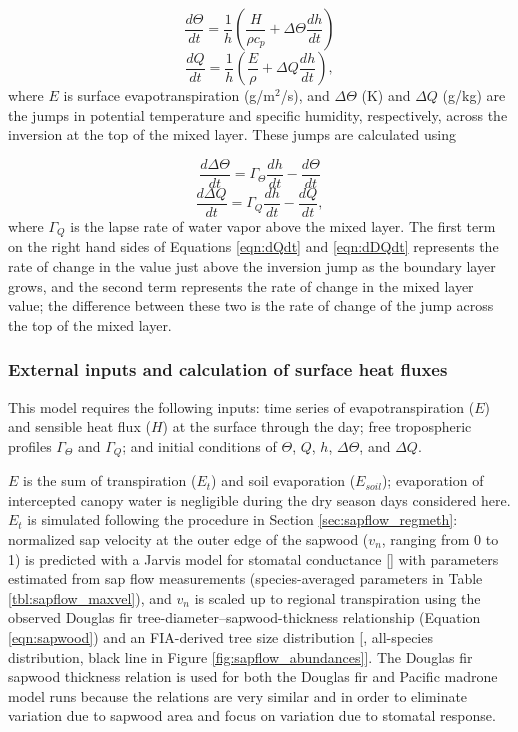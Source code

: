 \begin{equation}
\frac{d\Theta}{dt} = \frac{1}{h}\left(\frac{H}{\rho c_p}+\Delta\Theta\frac{dh}{dt}\right)
\label{eqn:dTdt}
\end{equation}
\begin{equation}
\frac{dQ}{dt} = \frac{1}{h}\left(\frac{E}{\rho}+\Delta Q \frac{dh}{dt}\right),
\label{eqn:dQdt}
\end{equation}
where $E$ is surface evapotranspiration (g/m$^2$/s), and $\Delta\Theta$ (K) and $\Delta Q$ (g/kg) are the jumps in potential temperature and specific humidity, respectively, across the inversion at the top of the mixed layer.  These jumps are calculated using

\begin{equation}
\frac{d\Delta\Theta}{dt} = \Gamma_\Theta\frac{dh}{dt}-\frac{d\Theta}{dt}
\label{eqn:dDTdt}
\end{equation}
\begin{equation}
\frac{d\Delta Q}{dt} = \Gamma_Q\frac{dh}{dt}-\frac{dQ}{dt},
\label{eqn:dDQdt}
\end{equation}
where $\Gamma_Q$ is the lapse rate of water vapor above the mixed layer.  The first term on the right hand sides of Equations \ref{eqn:dQdt} and \ref{eqn:dDQdt} represents the rate of change in the value just above the inversion jump as the boundary layer grows, and the second term represents the rate of change in the mixed layer value; the difference between these two is the rate of change of the jump across the top of the mixed layer.

\subsubsection{External inputs and calculation of surface heat fluxes}
This model requires the following inputs: time series of evapotranspiration ($E$) and sensible heat flux ($H$) at the surface through the day; free tropospheric profiles $\Gamma_{\Theta}$ and $\Gamma_{Q}$; and initial conditions of $\Theta$, $Q$, $h$, $\Delta \Theta$, and $\Delta Q$.

$E$ is the sum of transpiration ($E_t$) and soil evaporation ($E_{soil}$); evaporation of intercepted canopy water is negligible during the dry season days considered here.  $E_t$ is simulated following the procedure in Section \ref{sec:sapflow_regmeth}: normalized sap velocity at the outer edge of the sapwood ($v_n$, ranging from 0 to 1) is predicted with a Jarvis model for stomatal conductance [\cite{jarvis1976interpretation}] with parameters estimated from sap flow measurements (species-averaged parameters in Table \ref{tbl:sapflow_maxvel}), and $v_n$ is scaled up to regional transpiration using the observed Douglas fir tree-diameter--sapwood-thickness relationship (Equation \ref{eqn:sapwood}) and an FIA-derived tree size distribution [\cite{woudenberg2010forest}, all-species distribution, black line in Figure \ref{fig:sapflow_abundances}].  The Douglas fir sapwood thickness relation is used for both the Douglas fir and Pacific madrone model runs because the relations are very similar and in order to eliminate variation due to sapwood area and focus on variation due to stomatal response.

